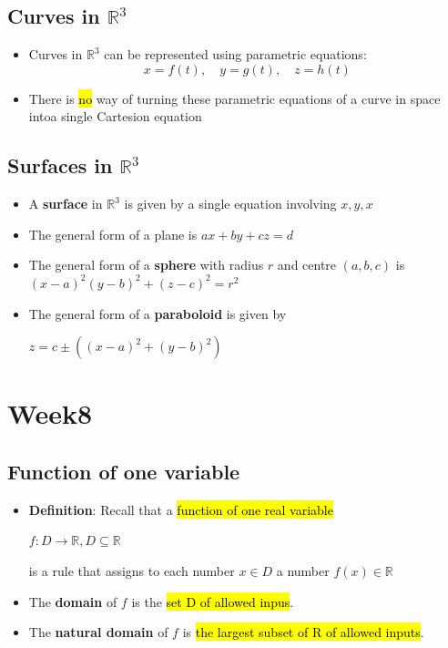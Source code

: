 \documentclass{article}
\begin{document}
  \subsection*{Curves in $\mathbb{R}^3$}
    \begin{itemize}
      \item Curves in \( \mathbb{R}^3 \) can be represented using parametric equations:
      \[
        x = f(t), \quad y = g(t), \quad z = h(t)
      \]
      
      \item There is \hl{no} way of turning these parametric equations of a curve in space intoa single Cartesion equation
    \end{itemize}


  \subsection*{Surfaces in $\mathbb{R}^3$}
  \begin{itemize}
    \item A \textbf{surface} in $\mathbb{R}^3$ is given by a single equation involving $x,y,x$
    \item The general form of a plane is $ax + by + cz = d$
    \item The general form of a \textbf{sphere} with radius $r$ and centre $(a,b,c)$ is $(x-a)^2 (y-b)^2 + (z-c)^2 = r^2$
    \item The general form of a \textbf{paraboloid} is given by 
    \begin{center}
      $z = c \pm ((x-a)^2 + (y-b)^2)$
    \end{center}
  \end{itemize}

\section{Week8}
  \subsection*{Function of one variable}
  \begin{itemize}
  	\item \textbf{Definition}: Recall that a \hl{function of one real variable}
  		\begin{center}
  			$f: D \rightarrow \mathbb{R}, D \subseteq \mathbb{R}$
  		\end{center}
  		is a rule that assigns to each number $x \in D$ a number $f(x) \in \mathbb{R}$
  	\item The \textbf{domain} of $f$ is the \hl{set D of allowed inpus}.
  	\item The \textbf{natural domain} of $f$ is \hl{the largest subset of R of allowed inputs}.
  \end{itemize}
\end{document}
